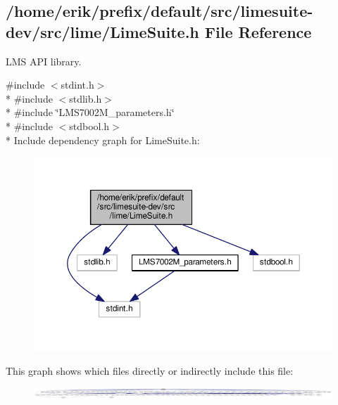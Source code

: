 \subsection{/home/erik/prefix/default/src/limesuite-\/dev/src/lime/\+Lime\+Suite.h File Reference}
\label{LimeSuite_8h}


L\+MS A\+PI library.  


{\ttfamily \#include $<$stdint.\+h$>$}\\*
{\ttfamily \#include $<$stdlib.\+h$>$}\\*
{\ttfamily \#include \char`\"{}L\+M\+S7002\+M\+\_\+parameters.\+h\char`\"{}}\\*
{\ttfamily \#include $<$stdbool.\+h$>$}\\*
Include dependency graph for Lime\+Suite.\+h\+:
\nopagebreak
\begin{figure}[H]
\begin{center}
\leavevmode
\includegraphics[width=350pt]{d8/de2/LimeSuite_8h__incl}
\end{center}
\end{figure}
This graph shows which files directly or indirectly include this file\+:
\nopagebreak
\begin{figure}[H]
\begin{center}
\leavevmode
\includegraphics[width=350pt]{d8/ddc/LimeSuite_8h__dep__incl}
\end{center}
\end{figure}
